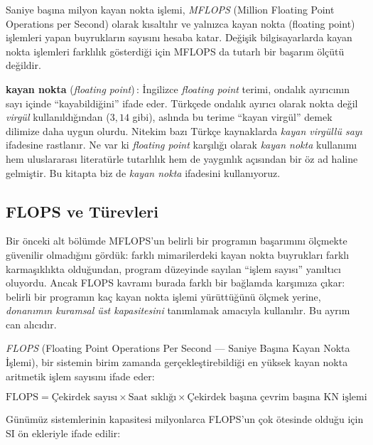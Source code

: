 Saniye başına milyon kayan nokta işlemi, \emph{MFLOPS} (Million Floating Point Operations per Second) olarak kısaltılır ve yalnızca kayan nokta (floating point) işlemleri yapan buyrukların sayısını hesaba katar. Değişik bilgisayarlarda kayan nokta işlemleri farklılık gösterdiği için MFLOPS da tutarlı bir başarım ölçütü değildir.

\begin{terimnotu}
\textbf{kayan nokta} (\emph{floating point})\,: İngilizce \emph{floating point} terimi, ondalık ayırıcının sayı içinde ``kayabildiğini'' ifade eder. Türkçede ondalık ayırıcı olarak nokta değil \emph{virgül} kullanıldığından ($3{,}14$ gibi), aslında bu terime ``kayan virgül'' demek dilimize daha uygun olurdu. Nitekim bazı Türkçe kaynaklarda \emph{kayan virgüllü sayı} ifadesine rastlanır. Ne var ki \emph{floating point} karşılığı olarak \emph{kayan nokta} kullanımı hem uluslararası literatürle tutarlılık hem de yaygınlık açısından bir öz ad haline gelmiştir. Bu kitapta biz de \emph{kayan nokta} ifadesini kullanıyoruz.
\end{terimnotu}

\subsection{FLOPS ve Türevleri}
\label{subsec:flops}

Bir önceki alt bölümde MFLOPS'un belirli bir programın başarımını ölçmekte güvenilir olmadığını gördük: farklı mimarilerdeki kayan nokta buyrukları farklı karmaşıklıkta olduğundan, program düzeyinde sayılan ``işlem sayısı'' yanıltıcı oluyordu. Ancak FLOPS kavramı burada farklı bir bağlamda karşımıza çıkar: belirli bir programın kaç kayan nokta işlemi yürüttüğünü ölçmek yerine, \emph{donanımın kuramsal üst kapasitesini} tanımlamak amacıyla kullanılır. Bu ayrım can alıcıdır.

\emph{FLOPS} (Floating Point Operations Per Second --- Saniye Başına Kayan Nokta İşlemi), bir sistemin birim zamanda gerçekleştirebildiği en yüksek kayan nokta aritmetik işlem sayısını ifade eder:

\begin{equation}
\text{FLOPS} = \text{Çekirdek sayısı} \times \text{Saat sıklığı} \times \text{Çekirdek başına çevrim başına KN işlemi}
\label{eq:flops}
\end{equation}

Günümüz sistemlerinin kapasitesi milyonlarca FLOPS'un çok ötesinde olduğu için SI ön ekleriyle ifade edilir:

